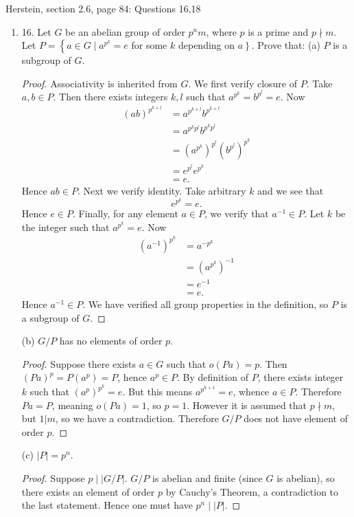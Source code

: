 Herstein, section 2.6, page 84: Questions 16,18
\begin{enumerate}
	\item 16. Let $G$ be an abelian group of order $p^n m$, where $p$ is a prime and $p \nmid m$. Let $P=\left\{a \in G \mid a^{p^k}=e\right.$ for some $k$ depending on $\left.a\right\}$. Prove that:
(a) $P$ is a subgroup of $G$.
\begin{proof}
	Associativity is inherited from $G$. We first verify closure of $P$. Take $a, b \in P$. Then there exists integers $k, l$ such that $a^{p^k} = b^{p^l} = e$. Now
	\begin{align*}
		(ab)^{p^{k+l}}
		&= a^{p^{k+l}}b^{p^{k+l}} \\
		&= a^{p^kp^l} b^{p^kp^l} \\
		&= \left( a^{p^k} \right)^{p^l}  \left( b^{p^l} \right)^{p^k}  \\
		&= e^{p^l}  e^{p^k}  \\
		&= e
	.\end{align*}
	Hence $ab \in P$. Next we verify identity.  Take arbitrary $k$ and we see that
	\[
		e^{p^k} = e
	.\]
	Hence $e \in P$. Finally, for any element $a \in P$, we verify that $a^{-1}  \in P$. Let $k$ be the integer such that $a^{p^k} = e$. Now
	\begin{align*}
		(a^{-1} )^{p^{k}} &= a^{-p^k} \\
		&= \left( a^{p^k} \right) ^{-1} \\
		&= e^{-1} \\
		&= e
	.\end{align*}
	Hence $a^{-1} \in P$. We have verified all group properties in the definition, so $P$ is a subgroup of $G$.
\end{proof}

(b) $G / P$ has no elements of order $p$.
\begin{proof}
	Suppose there exists $a \in G$ such that $o(Pa) = p$. Then $\left( Pa \right) ^p = P(a^p) = P$, hence $a^p \in P$. By definition of $P$, there exists integer $k$ such that $\left( a^p \right) ^{p^k} = e$. But this means $a^{p^{k+1}} = e$, whence $a \in P$. Therefore $Pa = P$, meaning $o(Pa) = 1$, so $p = 1$. However it is assumed that $p \nmid m$, but $1 | m$, so we have a contradiction. Therefore $G / P$ does not have element of order $p$.
\end{proof}

(c) $|P|=p^n$.
\begin{proof}
	Suppose $p \mid | G / P |$.  $G/P$ is abelian and finite (since $G$ is abelian), so there exists an element of order $p$ by Cauchy's Theorem, a contradiction to the last statement.
	Hence one must have $p^n \mid |P|$. 


\end{proof}
\end{enumerate}
